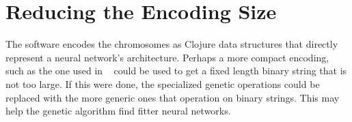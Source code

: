 \section{Reducing the Encoding Size}
The software encodes the chromosomes as Clojure data structures that
directly represent a neural network's architecture.
Perhaps a more compact encoding, such as the one used in
~\cite{kitano} could be used to get a fixed length binary string that is not too
large.
If this were done, the specialized genetic operations could be
replaced with the more generic ones that operation on binary strings.
This may help the genetic algorithm find fitter neural networks.









 





